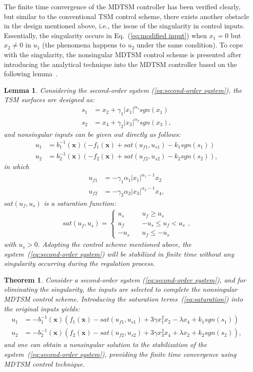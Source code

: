 \documentclass[3p]{elsarticle}
\theoremstyle{plain}
\newtheorem{mylem}{Lemma}
\newtheorem{mythm}{Theorem}
\theoremstyle{remark}
\begin{document}
The finite time convergence of the MDTSM controller has been verified clearly, but similar to the conventional TSM control scheme, there exists another obstacle in the design mentioned above, i.e., the issue of the singularity in control inputs. Essentially, the singularity occurs in Eq.~(\ref{eq:modified input}) when $x_1=0$ but $x_2\neq 0$ in $u_1$ (the phenomena happens to $u_2$ under the same condition). To cope with the singularity, the nonsingular MDTSM control scheme is presented after introducing the analytical technique into the MDTSM controller based on the following lemma~\cite{feng2013nonsingular}.
\begin{mylem}\label{lemma:3}
Considering the second-order system (\ref{eq:second-order system}), the TSM surfaces are designed as:
\begin{align*}
s_1 &= x_2+\gamma_1\vert x_1\vert^{\alpha_1}sgn(x_1)\\
s_2 &= x_4+\gamma_2\vert x_3\vert^{\alpha_2}sgn(x_3),
\end{align*}
and nonsingular inputs can be given out directly as follows:
\begin{align*}
u_1 &= b^{-1}_1(\bm x)(-f_1(\bm x)+sat(u_{f1},u_{s1})-k_1sgn(s_1))\\
u_2 &= b^{-1}_2(\bm x)(-f_2(\bm x)+sat(u_{f2},u_{s2})-k_2sgn(s_2)),
\end{align*}
in which
\begin{align*}
u_{f1}&=-\gamma_1\alpha_1\vert x_1\vert^{\alpha_1-1}x_2\\
u_{f2}&=-\gamma_2\alpha_2\vert x_3\vert^{\alpha_2-1}x_4,
\end{align*}
$sat(u_f,u_s)$ is a saturation function:
\begin{align}
sat(u_f,u_s)=
\begin{cases}
u_s\quad &u_f\ge u_s\\
u_f\quad &-u_s\le u_f< u_s\\
-u_s\quad &u_f\le -u_s\label{eq:saturation}
\end{cases},
\end{align}
with $u_s>0$. Adopting the control scheme mentioned above, the system~(\ref{eq:second-order system}) will be stabilized in finite time without any singularity occurring during the regulation process.
\end{mylem}
\begin{mythm}\label{theorem:3}
Consider a second-order system (\ref{eq:second-order system}), and for eliminating the singularity, the inputs are selected to complete the nonsingular MDTSM control scheme. Introducing the saturation terms~(\ref{eq:saturation}) into the original inputs yields:
\begin{align}
u_1 &= -b_1^{-1}(\bm x)(f_1(\bm x)-sat(u_{f1},u_{s1})+3\gamma x_1^2x_2-\lambda x_4+k_1sgn(s_1))\\
u_2 &= -b_2^{-1}(\bm x)(f_2(\bm x)-sat(u_{f2},u_{s2})+3\gamma x_3^2x_4+\lambda x_2+k_2sgn(s_2)),\label{eq:nonsingular modified input}
\end{align}
and one can obtain a nonsingular solution to the stabilization of the system~(\ref{eq:second-order system}), providing the finite time convergence using MDTSM control technique.
\end{mythm}
\end{document}
